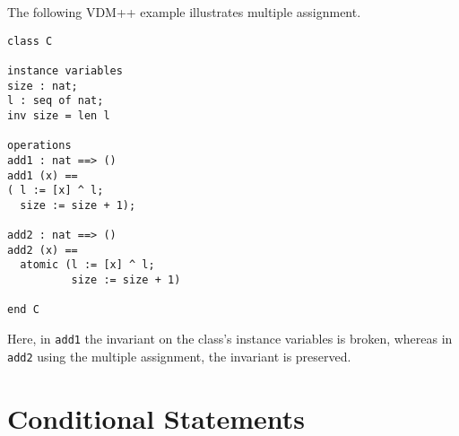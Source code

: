 \documentclass{overturerepchap}
\begin{document}
\begin{description}
  The following VDM++ example illustrates multiple assignment.
  \begin{lstlisting}
class C

instance variables
size : nat;
l : seq of nat;
inv size = len l

operations
add1 : nat ==> ()
add1 (x) ==
( l := [x] ^ l;
  size := size + 1);

add2 : nat ==> ()
add2 (x) ==
  atomic (l := [x] ^ l;
          size := size + 1)

end C
  \end{lstlisting}
Here, in \texttt{add1} the invariant on the class's instance variables
is broken, whereas in \texttt{add2} using the multiple assignment, the
invariant is preserved.

\end{description}

\section{Conditional Statements}\label{condstmt}
\end{document}
